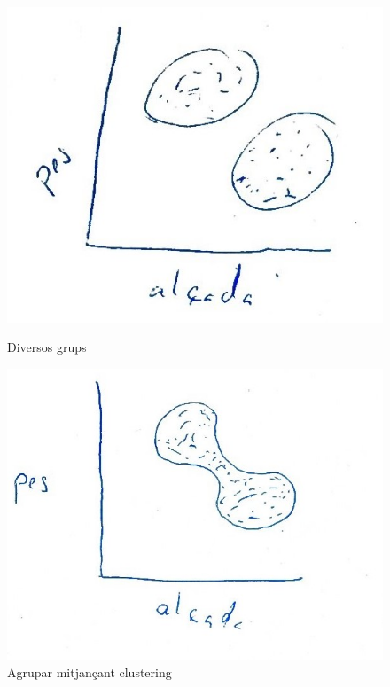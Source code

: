 \documentclass[a4paper]{article}
\begin{document}
\begin{figure}[h!]
    \centering
    \begin{minipage}[t]{0.49\textwidth}
        \centering
        \includegraphics[width=\textwidth]{figura_1}
        \caption{Diversos grups}
    \end{minipage}
    \hfill
    \begin{minipage}[t]{0.49\textwidth}
        \centering
        \includegraphics[width=\textwidth]{figura_2}
        \caption{Agrupar mitjançant clustering}
    \end{minipage}
\end{figure}
\end{document}
